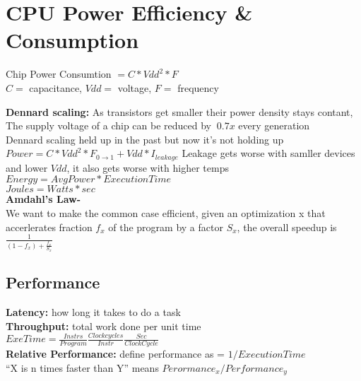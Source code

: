 \section{CPU Power Efficiency \& Consumption}
Chip Power Consumtion $= C*Vdd^2*F$\\
$C =$ capacitance, $Vdd = $ voltage, $F =$ frequency

\textbf{Dennard scaling:} As transistors get smaller their power density stays
contant, The supply voltage of a chip can be reduced by $~0.7x$ every generation \\
Dennard scaling held up in the past but now it's not holding up\\
$Power = C*Vdd^2*F_{0\rightarrow 1}+Vdd*I_{leakage}$
Leakage gets worse with samller devices and lower $Vdd$, it also gets worse with higher temps\\
$Energy = AvgPower * ExecutionTime$\\
$Joules = Watts * sec$ \\
\textbf{Amdahl's Law-}\\
We want to make the common case efficient, given an optimization x that accerlerates fraction $f_x$ of the program by a factor $S_x$, the overall speedup is
$\frac{1}{(1-f_x)+\frac{f_x}{S_x}}$

\subsection*{Performance}
\textbf{Latency:} how long it takes to do a task \\
\textbf{Throughput:} total work done per unit time \\
$ExeTime = \frac{Instrs}{Program}\frac{Clock cycles}{Instr}\frac{Sec}{ClockCycle}$\\
\textbf{Relative Performance:} define performance as = $1/ExecutionTime$\\
``X is n times faster than Y'' means $Perormance_x/Performance_y$\\
